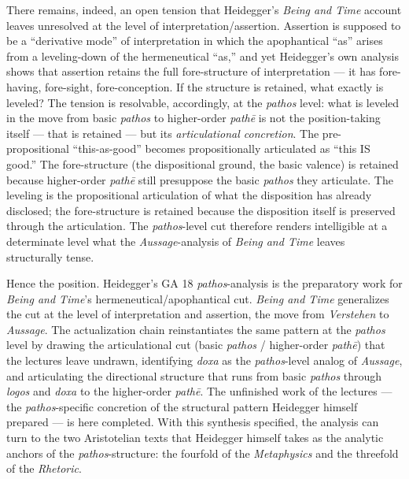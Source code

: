 There remains, indeed, an open tension that Heidegger's \textit{Being and Time} account leaves unresolved at the level of interpretation/assertion. Assertion is supposed to be a ``derivative mode'' of interpretation in which the apophantical ``as'' arises from a leveling-down of the hermeneutical ``as,'' and yet Heidegger's own analysis shows that assertion retains the full fore-structure of interpretation --- it has fore-having, fore-sight, fore-conception. If the structure is retained, what exactly is leveled? The tension is resolvable, accordingly, at the \textit{pathos} level: what is leveled in the move from basic \textit{pathos} to higher-order \textit{pathē} is not the position-taking itself --- that is retained --- but its \textit{articulational concretion}. The pre-propositional ``this-as-good'' becomes propositionally articulated as ``this IS good.'' The fore-structure (the dispositional ground, the basic valence) is retained because higher-order \textit{pathē} still presuppose the basic \textit{pathos} they articulate. The leveling is the propositional articulation of what the disposition has already disclosed; the fore-structure is retained because the disposition itself is preserved through the articulation. The \textit{pathos}-level cut therefore renders intelligible at a determinate level what the \textit{Aussage}-analysis of \textit{Being and Time} leaves structurally tense.

Hence the position. Heidegger's GA 18 \textit{pathos}-analysis is the preparatory work for \textit{Being and Time}'s hermeneutical/apophantical cut. \textit{Being and Time} generalizes the cut at the level of interpretation and assertion, the move from \textit{Verstehen} to \textit{Aussage}. The actualization chain reinstantiates the same pattern at the \textit{pathos} level by drawing the articulational cut (basic \textit{pathos} / higher-order \textit{pathē}) that the lectures leave undrawn, identifying \textit{doxa} as the \textit{pathos}-level analog of \textit{Aussage}, and articulating the directional structure that runs from basic \textit{pathos} through \textit{logos} and \textit{doxa} to the higher-order \textit{pathē}. The unfinished work of the lectures --- the \textit{pathos}-specific concretion of the structural pattern Heidegger himself prepared --- is here completed. With this synthesis specified, the analysis can turn to the two Aristotelian texts that Heidegger himself takes as the analytic anchors of the \textit{pathos}-structure: the fourfold of the \textit{Metaphysics} and the threefold of the \textit{Rhetoric}.

